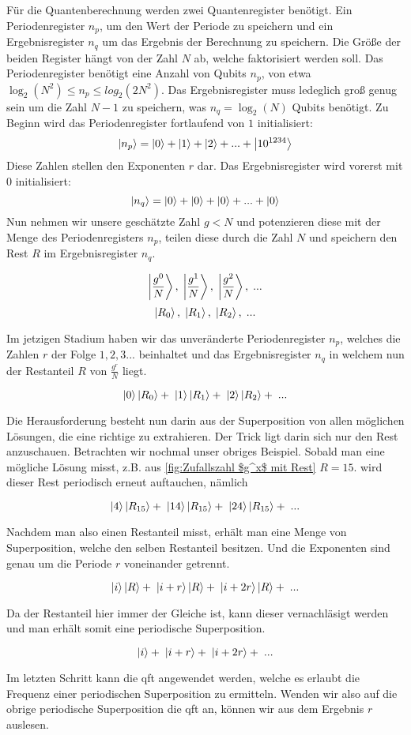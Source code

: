 Für die Quantenberechnung \cite[S.1-2]{amico_experimental_2019} werden zwei Quantenregister benötigt. Ein Periodenregister $n_p$, 
um den Wert der Periode zu speichern und ein Ergebnisregister $n_q$ um das Ergebnis der Berechnung zu speichern. 
Die Größe der beiden Register hängt von der Zahl $N$ ab, welche faktorisiert werden soll. 
Das Periodenregister benötigt eine Anzahl von Qubits $n_p$, von etwa $\log_2(N^2) \le n_p \le log_2(2N^2)$. 
Das Ergebnisregister muss ledeglich groß genug sein um die Zahl $N-1$ zu speichern, was $n_q = \log_2(N)$ Qubits benötigt.
Zu Beginn wird das Periodenregister fortlaufend von $1$ initialisiert: 
$$\ket{n_p} = \ket{0} + \ket{1} + \ket{2} + ... + \ket{10^{1234}}$$
Diese Zahlen stellen den Exponenten $r$ dar. Das Ergebnisregister wird vorerst mit $0$ initialisiert: 
$$\ket{n_q} = \ket{0} + \ket{0} + \ket{0} + ... + \ket{0}$$
Nun nehmen wir unsere geschätzte Zahl $g < N$ und potenzieren diese mit der Menge des Periodenregisters $n_p$, teilen diese durch die Zahl $N$ 
und speichern den Rest $R$ im Ergebnisregister $n_q$.

$$\ket{\frac{g^0}{N}},\;\ket{\frac{g^1}{N}},\;\ket{\frac{g^2}{N}},\;...$$
$$\ket{R_0},\; \ket{R_1},\; \ket{R_2},\;...$$

Im jetzigen Stadium haben wir das unveränderte Periodenregister $n_p$, welches die Zahlen $r$ der Folge $1, 2, 3...$ beinhaltet 
und das Ergebnisregister $n_q$ in welchem nun der Restanteil $R$ von $\frac{g^r}{N}$ liegt.

$$\ket{0}\ket{R_0} + \;\ket{1}\ket{R_1} + \;\ket{2}\ket{R_2} + \;...$$

Die Herausforderung besteht nun darin aus der Superposition von allen möglichen Lösungen, die eine richtige zu extrahieren. 
Der Trick ligt darin sich nur den Rest anzuschauen. Betrachten wir nochmal unser obriges Beispiel. Sobald man eine mögliche Lösung misst, 
z.B. aus \ref{fig:Zufallszahl $g^x$ mit Rest} $R = 15$. wird dieser Rest periodisch erneut auftauchen, nämlich

$$\ket{4}\ket{R_{15}} + \;\ket{14}\ket{R_{15}} + \;\ket{24}\ket{R_{15}} + \;...$$

Nachdem man also einen Restanteil misst, erhält man eine Menge von Superposition, welche den selben Restanteil besitzen. 
Und die Exponenten sind genau um die Periode $r$ voneinander getrennt.

$$\ket{i}\ket{R} + \;\ket{i+r}\ket{R} + \;\ket{i+2r}\ket{R} + \;...$$

Da der Restanteil hier immer der Gleiche ist, kann dieser vernachläsigt werden und man erhält somit eine periodische Superposition.

$$\ket{i} + \;\ket{i+r} + \;\ket{i+2r} + \;...$$

Im letzten Schritt kann die \ac{qft} angewendet werden, welche es erlaubt die Frequenz einer periodischen Superposition zu ermitteln. \cite[S. 2]{amico_experimental_2019}
Wenden wir also auf die obrige periodische Superposition die \ac{qft} an, können wir aus dem Ergebnis $r$ auslesen.\\
